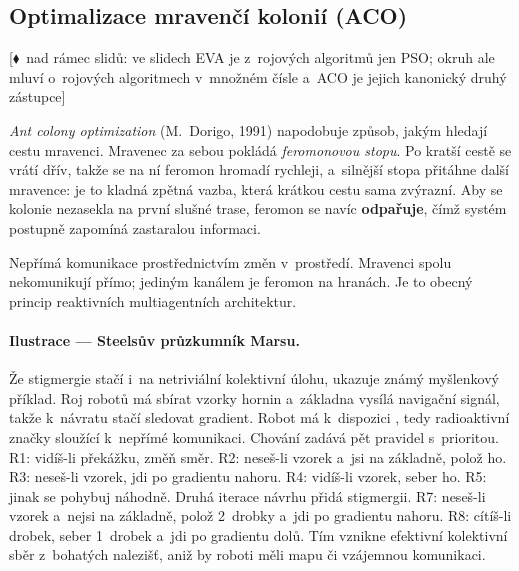 \documentclass[11pt,a4paper]{article}
\theoremstyle{definition}
\newcommand{\mimoq}[1]{\textcolor{markcol}{\textsf{\footnotesize[$\blacklozenge$~nad rámec slidů: #1]}}}
\begin{document}
\subsection{Optimalizace mravenčí kolonií (ACO)}

\noindent\mimoq{ve slidech EVA je z~rojových algoritmů jen PSO; okruh ale mluví
o~rojových algoritmech v~množném čísle a~ACO je jejich kanonický druhý zástupce}

\emph{Ant colony optimization} (M.~Dorigo, 1991) napodobuje způsob, jakým hledají cestu
mravenci. Mravenec za sebou pokládá \emph{feromonovou stopu}. Po kratší cestě se vrátí dřív,
takže se na ní feromon hromadí rychleji, a~silnější stopa přitáhne další mravence: je to
kladná zpětná vazba, která krátkou cestu sama zvýrazní. Aby se kolonie nezasekla na první
slušné trase, feromon se navíc \textbf{odpařuje}, čímž systém postupně zapomíná zastaralou
informaci.

\begin{defbox}[Stigmergie]
Nepřímá komunikace prostřednictvím změn v~prostředí. Mravenci spolu
nekomunikují přímo; jediným kanálem je feromon na hranách. Je to obecný princip
reaktivních multiagentních architektur.
\end{defbox}

\paragraph{Ilustrace --- Steelsův průzkumník Marsu.} Že stigmergie stačí i~na netriviální
kolektivní úlohu, ukazuje známý myšlenkový příklad. Roj robotů má sbírat vzorky hornin
a~základna vysílá navigační signál, takže k~návratu stačí sledovat gradient. Robot má
k~dispozici , tedy radioaktivní značky sloužící k~nepřímé komunikaci. Chování
zadává pět pravidel s~prioritou. R1: vidíš-li překážku, změň směr. R2: neseš-li vzorek a~jsi
na základně, polož ho. R3: neseš-li vzorek, jdi po gradientu nahoru. R4: vidíš-li vzorek,
seber ho. R5: jinak se pohybuj náhodně. Druhá iterace návrhu přidá stigmergii. R7: neseš-li
vzorek a~nejsi na základně, polož 2~drobky a~jdi po gradientu nahoru. R8: cítíš-li drobek,
seber 1~drobek a~jdi po gradientu dolů. Tím vznikne efektivní kolektivní sběr z~bohatých
nalezišť, aniž by roboti měli mapu či vzájemnou komunikaci.
\end{document}
